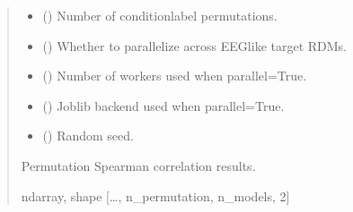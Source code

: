 \documentclass[letterpaper,10pt,english]{sphinxhowto}
\begin{document}
\begin{fulllineitems}
\begin{quote}
\begin{description}
\begin{itemize}
\item {} 
\sphinxAtStartPar
{} (\sphinxstyleliteralemphasis{\sphinxupquote{, }}) \textendash{} Number of condition\sphinxhyphen{}label permutations.

\item {} 
\sphinxAtStartPar
{} (\sphinxstyleliteralemphasis{\sphinxupquote{, }}) \textendash{} Whether to parallelize across EEG\sphinxhyphen{}like target RDMs.

\item {} 
\sphinxAtStartPar
{} (\sphinxstyleliteralemphasis{\sphinxupquote{, }}) \textendash{} Number of workers used when parallel=True.

\item {} 
\sphinxAtStartPar
{} (\sphinxstyleliteralemphasis{\sphinxupquote{, }}\sphinxstyleliteralemphasis{\sphinxupquote{, }}) \textendash{} Joblib backend used when parallel=True.

\item {} 
\sphinxAtStartPar
{} (\sphinxstyleliteralemphasis{\sphinxupquote{, }}) \textendash{} Random seed.

\end{itemize}

\sphinxAtStartPar
{} \textendash{} Permutation Spearman correlation results.

\sphinxAtStartPar
ndarray, shape {[}…, n\_permutation, n\_models, 2{]}

\end{description}\end{quote}

\end{fulllineitems}
\end{document}
